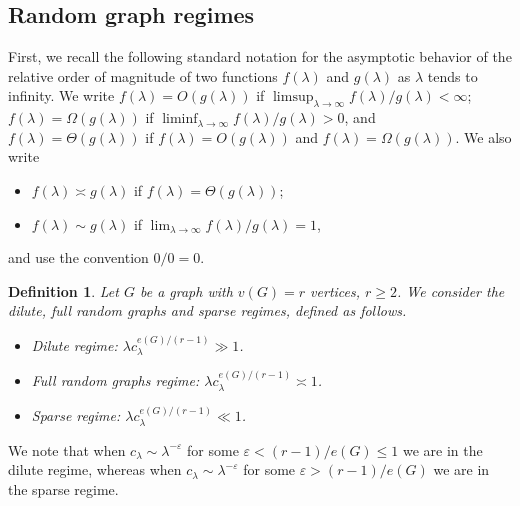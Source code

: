 \documentclass[12pt]{article}
\newtheorem{definition}[prop]{Definition}
\numberwithin{equation}{section}
\begin{document}
\subsection*{Random graph regimes} 
\noindent
First, we recall the following standard notation for the asymptotic behavior of the relative order of magnitude of two functions $f(\lambda )$ and $g(\lambda )$ as $\lambda$ tends to infinity.
We write $f(\lambda )=O(g(\lambda ))$ if $\limsup_{\lambda \to\infty} f(\lambda ) / g(\lambda ) <\infty$;  $f(\lambda )=\Omega(g(\lambda ))$ if $\liminf_{\lambda \to\infty} f(\lambda ) / g(\lambda )>0$, and $f(\lambda )=\Theta(g(\lambda ))$ if $f(\lambda )=O(g(\lambda ))$ and $f(\lambda )=\Omega(g(\lambda ))$. We also write
\begin{itemize}
    \item $f(\lambda )\asymp g(\lambda )$ if $f(\lambda )=\Theta(g(\lambda ))$;
    \item $f(\lambda )\sim g(\lambda )$ if $\lim_{\lambda \to \infty} f(\lambda )/g(\lambda ) = 1$, 
\end{itemize}
 and use the convention $0/0=0.$
\begin{definition}
  Let $G$ be a graph with $v(G)=r$ vertices, $r \geq 2$.
  We consider the dilute, full random graphs
  and sparse regimes, defined
  as follows.  
\begin{itemize}
\item Dilute regime:
$\lambda c_\lambda^{e(G)/ ( r-1 )}\gg1$. 
\item Full random graphs regime:
$\lambda c_\lambda^{e(G)/ ( r-1 )}\asymp 1$. 
  \item Sparse regime: $\lambda c_\lambda^{e(G)/ ( r-1 )}\ll1$. 
\end{itemize}
\end{definition}
 We note that when 
 $c_\lambda\sim\lambda^{-\varepsilon}$ for some
 $\varepsilon < (r-1)/e(G)\leq 1$ 
 we are in the dilute regime,
 whereas when $c_\lambda\sim \lambda^{-\varepsilon}$
 for some $\varepsilon > (r-1)/e(G)$
 we are in the sparse regime.
\end{document}
